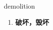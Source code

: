 
\begin{frame}
{\huge demolition}
\begin{center}
\begin{enumerate}\Large
  \item \textbf{破坏，毁坏}
\end{enumerate}
\end{center}
\end{frame}
